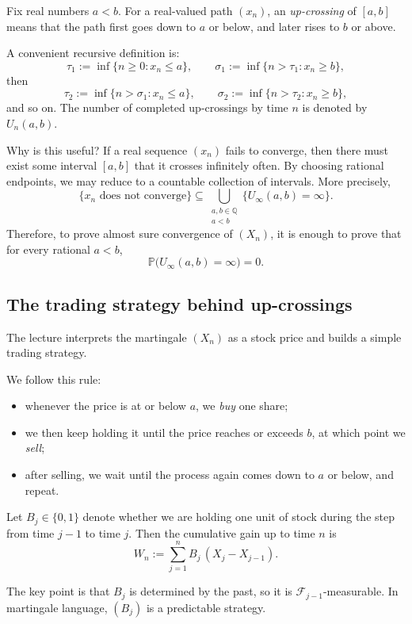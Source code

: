 \documentclass[11pt]{article}
\theoremstyle{definition}
\begin{document}
Fix real numbers \(a<b\). For a real-valued path \((x_n)\), an \emph{up-crossing} of \([a,b]\) means that the path first goes down to \(a\) or below, and later rises to \(b\) or above.

A convenient recursive definition is:
\[
\tau_1 := \inf\{n\ge 0 : x_n\le a\},
\qquad
\sigma_1 := \inf\{n>\tau_1 : x_n\ge b\},
\]
then
\[
\tau_2 := \inf\{n>\sigma_1 : x_n\le a\},
\qquad
\sigma_2 := \inf\{n>\tau_2 : x_n\ge b\},
\]
and so on. The number of completed up-crossings by time \(n\) is denoted by \(U_n(a,b)\).

Why is this useful? If a real sequence \((x_n)\) fails to converge, then there must exist some interval \([a,b]\) that it crosses infinitely often. By choosing rational endpoints, we may reduce to a countable collection of intervals. More precisely,
\[
\{x_n \text{ does not converge}\}
\subseteq
\bigcup_{\substack{a,b\in\mathbb Q \\ a<b}}
\{U_\infty(a,b)=\infty\}.
\]
Therefore, to prove almost sure convergence of \((X_n)\), it is enough to prove that for every rational \(a<b\),
\[
\mathbb P\big(U_\infty(a,b)=\infty\big)=0.
\]

\subsection{The trading strategy behind up-crossings}

The lecture interprets the martingale \((X_n)\) as a stock price and builds a simple trading strategy.

We follow this rule:
\begin{itemize}[leftmargin=2em]
    \item whenever the price is at or below \(a\), we \emph{buy} one share;
    \item we then keep holding it until the price reaches or exceeds \(b\), at which point we \emph{sell};
    \item after selling, we wait until the process again comes down to \(a\) or below, and repeat.
\end{itemize}

Let \(B_j\in\{0,1\}\) denote whether we are holding one unit of stock during the step from time \(j-1\) to time \(j\). Then the cumulative gain up to time \(n\) is
\[
W_n := \sum_{j=1}^n B_j\,(X_j-X_{j-1}).
\]

The key point is that \(B_j\) is determined by the past, so it is \(\mathcal F_{j-1}\)-measurable. In martingale language, \((B_j)\) is a predictable strategy.
\end{document}
